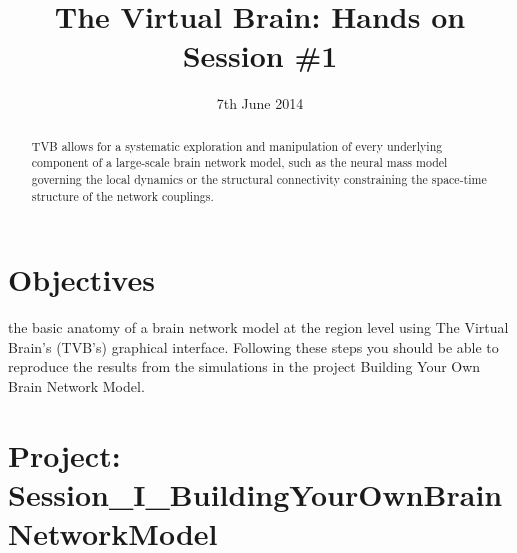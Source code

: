 \documentclass{tufte-handout}
\title{The Virtual Brain: Hands on Session \#1}
\date{7th June 2014}
\begin{document}

\newpage
\ClearWallPaper
\begin{abstract}
\noindent TVB allows for a systematic exploration and manipulation of every
underlying component of a large-scale brain network model, such as the neural
mass model governing the local dynamics  or the structural connectivity
constraining the space-time structure of the network couplings.
\begin{marginfigure}%
  \label{fig:marginfig}
\end{marginfigure}
\end{abstract}



\section{Objectives}\label{sec:objectives}

 the basic anatomy of a brain network model at the region level using The
Virtual Brain's (TVB's) graphical interface. Following these steps you should
be able to reproduce the results from the simulations in the project Building
Your Own Brain Network Model.

\section{Project:  Session\_I\_BuildingYourOwnBrainNetworkModel}\label{sec:project_data}
\end{document}
